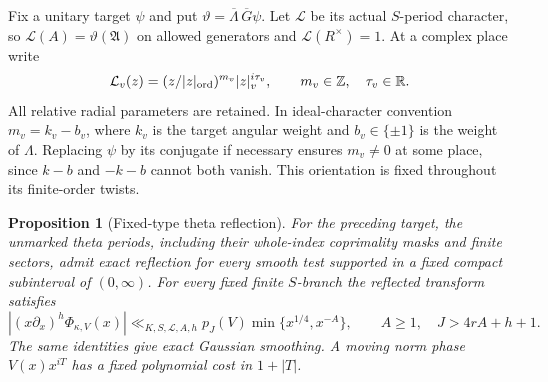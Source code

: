 \documentclass[11pt,a4paper]{article}
\numberwithin{equation}{section}
\newtheorem{proposition}[theorem]{Proposition}
\theoremstyle{definition}
\theoremstyle{remark}
\begin{document}
Fix a unitary target $\psi$ and put
$\vartheta=\overline\Lambda\,\overline G\psi$.
Let $\mathcal L$ be its actual $S$-period character, so
$\mathcal L(A)=\vartheta(\mathfrak A)$ on allowed generators and
$\mathcal L(R^\times)=1$.  At a complex place write
\begin{equation}\label{eq:period-infinity-type}
 \mathcal L_v(z)=(z/|z|_{\rm ord})^{m_v}|z|_v^{i\tau_v},
 \qquad m_v\in\mathbb Z,\quad\tau_v\in\mathbb R.
\end{equation}
All relative radial parameters are retained.  In ideal-character
convention $m_v=k_v-b_v$, where $k_v$ is the target angular weight and
$b_v\in\{\pm1\}$ is the weight of $\Lambda$.  Replacing $\psi$ by its
conjugate if necessary ensures $m_v\ne0$ at some place, since $k-b$ and
$-k-b$ cannot both vanish.  This orientation is fixed throughout its
finite-order twists.

\begin{proposition}[Fixed-type theta reflection]\label{prop:fixed-type-theta}
For the preceding target, the unmarked theta periods, including their
whole-index coprimality masks and finite sectors, admit exact reflection for every
smooth test supported in a fixed compact subinterval of $(0,\infty)$.
For every fixed finite $S$-branch the reflected transform satisfies
\begin{equation}\label{eq:theta-kernel-bound}
 |(x\partial_x)^h\Phi_{\kappa,V}(x)|
 \ll_{K,S,\mathcal L,A,h}p_J(V)\min\{x^{1/4},x^{-A}\},
 \qquad A\ge1,\quad J>4rA+h+1.
\end{equation}
The same identities give exact Gaussian smoothing.  A moving norm phase
$V(x)x^{iT}$ has a fixed polynomial cost in $1+|T|$.
\end{proposition}
\end{document}
